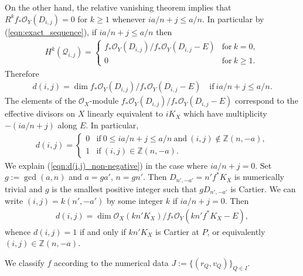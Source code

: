 \documentclass[a4paper,11pt]{amsart}
\theoremstyle{definition}
\theoremstyle{remark}
\numberwithin{equation}{section}
\newcommand{\bZ}{{\mathbb Z}}
\newcommand{\cO}{{\mathcal O}}
\newcommand{\cQ}{{\mathcal Q}}
\begin{document}
On the other hand,
the relative vanishing theorem \cite[Theorem 1-2-5]{KMM87} implies that
$R^kf_*\cO_Y(D_{i,j})=0$ for $k\ge1$ whenever $ia/n+j \le a/n$.
In particular by (\ref{eqn:exact_sequence}), if $ia/n+j \le a/n$ then
\begin{align}\label{eqn:H^k(Q)}
H^k(\cQ_{i,j})=
\begin{cases}
f_*\cO_Y(D_{i,j})/f_*\cO_Y(D_{i,j}-E) & \textrm{for} \ k=0,\\
0                                     & \textrm{for} \ k\ge 1.
\end{cases}
\end{align}
Therefore
\begin{align}\label{eqn:d(i,j)=dim}
d(i,j)=\dim f_*\cO_Y(D_{i,j})/f_*\cO_Y(D_{i,j}-E)
\quad \textrm{if} \ ia/n+j \le a/n.
\end{align}
The elements of the $\cO_X$-module $f_*\cO_Y(D_{i,j})/f_*\cO_Y(D_{i,j}-E)$
correspond to the effective divisors on $X$ linearly equivalent to $iK_X$
which have multiplicity $-(ia/n+j)$ along $E$.
In particular,
\begin{align}\label{eqn:d(i,j)_non-negative}
d(i,j)=
\begin{cases}
0 & \textrm{if} \ 0 \le ia/n+j \le a/n \
    \textrm{and} \ (i,j)\not\in\bZ(n, -a),\\
1 & \textrm{if} \ (i,j)\in\bZ(n, -a).
\end{cases}
\end{align}
We explain (\ref{eqn:d(i,j)_non-negative}) in the case where $ia/n+j=0$.
Set $g:=\gcd(a, n)$ and $a=ga'$, $n=gn'$.
Then $D_{n',-a'}=n'f^*K_X$ is numerically trivial
and $g$ is the smallest positive integer such that
$gD_{n',-a'}$ is Cartier.
We can write $(i,j)=k(n',-a')$ by some integer $k$ if $ia/n+j=0$.
Then
\begin{align*}
d(i,j)=\dim \cO_X(kn'K_X)/f_*\cO_Y(kn'f^*K_X-E),
\end{align*}
whence $d(i, j)=1$ if and only if $kn'K_X$ is Cartier at $P$,
or equivalently $(i,j)\in\bZ(n, -a)$.

We classify $f$ according to the numerical data $J:=\{(r_Q,v_Q)\}_{Q\in I}$.
\end{document}
